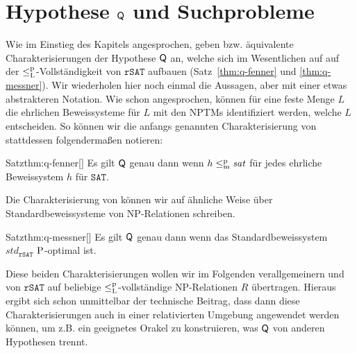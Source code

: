 \section{Hypothese $\hQ$ und Suchprobleme}\label{sec:q-vs-search}

Wie im Einstieg des Kapitels angesprochen, geben \textcite{fenner_inverting_2003} bzw. \textcite{kobler_is_2000} äquivalente Charakterisierungen der Hypothese $\hQ$ an, welche sich im Wesentlichen auf auf der $\leqlp$-Vollständigkeit von $\mathtt{rSAT}$ aufbauen (Satz~\ref{thm:q-fenner} und \ref{thm:q-messner}).
Wir wiederholen hier noch einmal die Aussagen, aber mit einer etwas abstrakteren Notation.
Wie schon angesprochen, können für eine feste Menge $L$ die ehrlichen Beweissysteme für $L$ mit den NPTMs identifiziert werden, welche $L$ entscheiden.
So können wir die anfangs genannten Charakterisierung von \citeauthor{fenner_inverting_2003} stattdessen folgendermaßen notieren:
\begin{reptheorem}{Satz}{thm:q-fenner}[\cite{fenner_inverting_2003}]
    Es gilt $\hQ$ genau dann wenn $h\leqmp\mathit{sat}$ für jedes ehrliche Beweissystem $h$ für $\mathtt{SAT}$. 
\end{reptheorem}
Die Charakterisierung von \citeauthor{kobler_is_2000} können wir auf ähnliche Weise über Standardbeweissysteme von NP-Relationen schreiben.
\begin{reptheorem}{Satz}{thm:q-messner}[\cite{kobler_is_2000}]
    Es gilt $\hQ$ genau dann wenn das Standardbeweissystem $\mathit{std}_\mathtt{rSAT}$ $\P$-optimal ist.
\end{reptheorem}

Diese beiden Charakterisierungen wollen wir im Folgenden verallgemeinern und von $\mathtt{rSAT}$ auf beliebige $\leqlp$-vollständige NP-Relationen $R$ übertragen. 
Hieraus ergibt sich schon unmittelbar der technische Beitrag, dass dann diese Charakterisierungen auch in einer relativierten Umgebung angewendet werden können, um z.B. ein geeignetes Orakel zu konstruieren, was $\hQ$ von anderen Hypothesen trennt.

